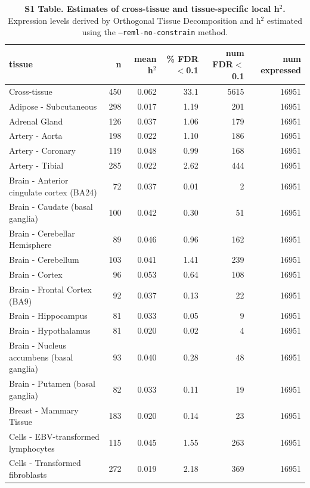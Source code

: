 \documentclass[10pt,letterpaper]{article}
\begin{document}
\begin{table}[!ht]
\begin{adjustwidth}{-2.25in}{0in} %
\caption*{{\bf S1 Table. Estimates of cross-tissue and tissue-specific local h$^2$.} Expression levels derived by Orthogonal Tissue Decomposition and h$^2$ estimated using the \texttt{--reml-no-constrain} method.}
\centering
\begin{tabular}{lrrrrr}
  \hline
tissue & n & mean h$^2$ & \% FDR$<$0.1 & num FDR$<$0.1 & num expressed \\ 
  \hline
Cross-tissue & 450 & 0.062 & 33.1 & 5615 & 16951 \\ 
  Adipose - Subcutaneous & 298 & 0.017 & 1.19 & 201 & 16951 \\ 
  Adrenal Gland & 126 & 0.037 & 1.06 & 179 & 16951 \\ 
  Artery - Aorta & 198 & 0.022 & 1.10 & 186 & 16951 \\ 
  Artery - Coronary & 119 & 0.048 & 0.99 & 168 & 16951 \\ 
  Artery - Tibial & 285 & 0.022 & 2.62 & 444 & 16951 \\ 
  Brain - Anterior cingulate cortex (BA24) & 72 & 0.037 & 0.01 & 2 & 16951 \\ 
  Brain - Caudate (basal ganglia) & 100 & 0.042 & 0.30 & 51 & 16951 \\ 
  Brain - Cerebellar Hemisphere & 89 & 0.046 & 0.96 & 162 & 16951 \\ 
  Brain - Cerebellum & 103 & 0.041 & 1.41 & 239 & 16951 \\ 
  Brain - Cortex & 96 & 0.053 & 0.64 & 108 & 16951 \\ 
  Brain - Frontal Cortex (BA9) & 92 & 0.037 & 0.13 & 22 & 16951 \\ 
  Brain - Hippocampus & 81 & 0.033 & 0.05 & 9 & 16951 \\ 
  Brain - Hypothalamus & 81 & 0.020 & 0.02 & 4 & 16951 \\ 
  Brain - Nucleus accumbens (basal ganglia) & 93 & 0.040 & 0.28 & 48 & 16951 \\ 
  Brain - Putamen (basal ganglia) & 82 & 0.033 & 0.11 & 19 & 16951 \\ 
  Breast - Mammary Tissue & 183 & 0.020 & 0.14 & 23 & 16951 \\ 
  Cells - EBV-transformed lymphocytes & 115 & 0.045 & 1.55 & 263 & 16951 \\ 
  Cells - Transformed fibroblasts & 272 & 0.019 & 2.18 & 369 & 16951 \\ 

\end{tabular}
\end{adjustwidth}
\end{table}
\end{document}

